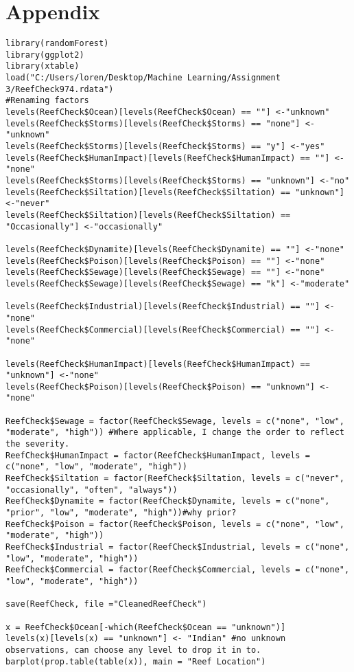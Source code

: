 \documentclass{article}
\begin{document}
\section{Appendix}
\begin{verbatim}
library(randomForest)
library(ggplot2)
library(xtable)
load("C:/Users/loren/Desktop/Machine Learning/Assignment 3/ReefCheck974.rdata")
#Renaming factors
levels(ReefCheck$Ocean)[levels(ReefCheck$Ocean) == ""] <-"unknown"
levels(ReefCheck$Storms)[levels(ReefCheck$Storms) == "none"] <-"unknown"
levels(ReefCheck$Storms)[levels(ReefCheck$Storms) == "y"] <-"yes"
levels(ReefCheck$HumanImpact)[levels(ReefCheck$HumanImpact) == ""] <-"none"
levels(ReefCheck$Storms)[levels(ReefCheck$Storms) == "unknown"] <-"no"
levels(ReefCheck$Siltation)[levels(ReefCheck$Siltation) == "unknown"] <-"never"
levels(ReefCheck$Siltation)[levels(ReefCheck$Siltation) == "Occasionally"] <-"occasionally"

levels(ReefCheck$Dynamite)[levels(ReefCheck$Dynamite) == ""] <-"none"
levels(ReefCheck$Poison)[levels(ReefCheck$Poison) == ""] <-"none"
levels(ReefCheck$Sewage)[levels(ReefCheck$Sewage) == ""] <-"none"
levels(ReefCheck$Sewage)[levels(ReefCheck$Sewage) == "k"] <-"moderate"

levels(ReefCheck$Industrial)[levels(ReefCheck$Industrial) == ""] <-"none"
levels(ReefCheck$Commercial)[levels(ReefCheck$Commercial) == ""] <-"none"

levels(ReefCheck$HumanImpact)[levels(ReefCheck$HumanImpact) == "unknown"] <-"none"
levels(ReefCheck$Poison)[levels(ReefCheck$Poison) == "unknown"] <-"none"

ReefCheck$Sewage = factor(ReefCheck$Sewage, levels = c("none", "low", "moderate", "high")) #Where applicable, I change the order to reflect the severity. 
ReefCheck$HumanImpact = factor(ReefCheck$HumanImpact, levels = c("none", "low", "moderate", "high"))
ReefCheck$Siltation = factor(ReefCheck$Siltation, levels = c("never", "occasionally", "often", "always"))
ReefCheck$Dynamite = factor(ReefCheck$Dynamite, levels = c("none", "prior", "low", "moderate", "high"))#why prior?
ReefCheck$Poison = factor(ReefCheck$Poison, levels = c("none", "low", "moderate", "high"))
ReefCheck$Industrial = factor(ReefCheck$Industrial, levels = c("none", "low", "moderate", "high"))
ReefCheck$Commercial = factor(ReefCheck$Commercial, levels = c("none", "low", "moderate", "high"))

save(ReefCheck, file ="CleanedReefCheck")

x = ReefCheck$Ocean[-which(ReefCheck$Ocean == "unknown")]
levels(x)[levels(x) == "unknown"] <- "Indian" #no unknown observations, can choose any level to drop it in to.
barplot(prop.table(table(x)), main = "Reef Location")



\end{verbatim}
\end{document}
